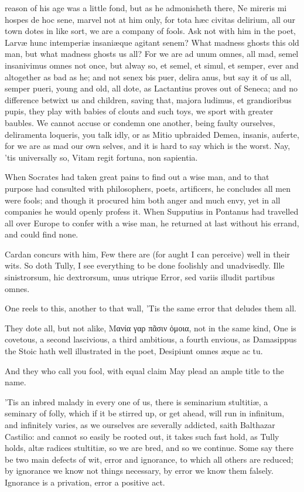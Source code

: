 {reason of his age was a little fond, but as he admonisheth there, Ne
mireris mi hospes de hoc sene, marvel not at him only, for tota h\ae{}c
civitas delirium, all our town dotes in like sort, we are a
company of fools. Ask not with him in the poet, Larv\ae{} hunc
intemperi\ae{} insani\ae{}que agitant senem? What madness ghosts this old
man, but what madness ghosts us all? For we are ad unum omnes, all mad,
semel insanivimus omnes not once, but alway so, et semel, et simul, et
semper, ever and altogether as bad as he; and not senex bis puer,
delira anus, but say it of us all, semper pueri, young and old, all
dote, as Lactantius proves out of Seneca; and no difference betwixt us
and children, saving that, majora ludimus, et grandioribus pupis, they
play with babies of clouts and such toys, we sport with greater
baubles. We cannot accuse or condemn one another, being faulty
ourselves, deliramenta loqueris, you talk idly, or as Mitio
upbraided Demea, insanis, auferte, for we are as mad our own selves,
and it is hard to say which is the worst. Nay, 'tis universally so,
Vitam regit fortuna, non sapientia.

When Socrates had taken great pains to find out a wise man, and to
that purpose had consulted with philosophers, poets, artificers, he
concludes all men were fools; and though it procured him both anger and
much envy, yet in all companies he would openly profess it. When 
Supputius in Pontanus had travelled all over Europe to confer with a
wise man, he returned at last without his errand, and could find none.

 Cardan concurs with him, Few there are (for aught I can perceive)
well in their wits. So doth Tully, I see everything to be done
foolishly and unadvisedly.
Ille sinistrorsum, hic dextrorsum, unus utrique
Error, sed variis illudit partibus omnes.

One reels to this, another to that wall,
'Tis the same error that deludes them all.

They dote all, but not alike, Μανία γαρ πᾶσιν ὁμοια, not in the
same kind, One is covetous, a second lascivious, a third ambitious, a
fourth envious, \etc as Damasippus the Stoic hath well illustrated in
the poet,
Desipiunt omnes \ae{}que ac tu.

And they who call you fool, with equal claim
May plead an ample title to the name.

'Tis an inbred malady in every one of us, there is seminarium
stultiti\ae{}, a seminary of folly, which if it be stirred up, or get
ahead, will run in infinitum, and infinitely varies, as we ourselves
are severally addicted, saith Balthazar Castilio: and cannot so
easily be rooted out, it takes such fast hold, as Tully holds, alt\ae{}
radices stultiti\ae{}, so we are bred, and so we continue. Some say
there be two main defects of wit, error and ignorance, to which all
others are reduced; by ignorance we know not things necessary, by error
we know them falsely. Ignorance is a privation, error a positive act.

}
